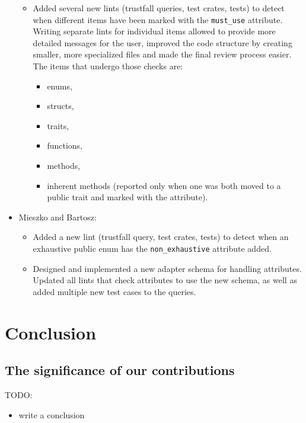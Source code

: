 \documentclass[licencjacka,en]{pracamgr}
\begin{document}
\begin{itemize}
\begin{itemize}
			\item Added several new lints (trustfall queries, test crates, tests) to detect
				when different items have been marked with the \texttt{must\_use} attribute.
				Writing separate lints for individual items allowed to provide more detailed
				messages for the user, improved the code structure by creating smaller,
				more specialized files and made the final review process easier. The items that
				undergo those checks are:
				\begin{itemize}
					\item enums,
					\item structs,
					\item traits,
					\item functions,
					\item methods,
					\item inherent methods (reported only when one was both moved to a public trait
						and marked with the attribute).
				\end{itemize}
		\end{itemize}

	\item Mieszko and Bartosz:
		\begin{itemize}
			\item Added a new lint (trustfall query, test crates, tests) to detect when
				an exhaustive public enum has the \texttt{non\_exhaustive} attribute added.
			\item Designed and implemented a new adapter schema for handling attributes.
				Updated all lints that check attributes to use the new schema, as well as added
				multiple new test cases to the queries.
		\end{itemize}
\end{itemize}


\chapter{Conclusion}\label{r:chapter_conclusion}

\section{The significance of our contributions}\label{r:section_significance_of_contributions}

TODO:
\begin{itemize}
	\item write a conclusion
\end{itemize}
\end{document}
